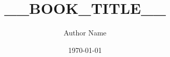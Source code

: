 \title{__BOOK_TITLE__}
\author{Author Name}
\date{\today}
\newcommand{\bookversion}{0.1.0}
\newcommand{\bookslug}{__BOOK_SLUG__}
\newcommand{\bookcoursecode}{COURSE}
\newcommand{\bookdisplaytitle}{__BOOK_TITLE__}
